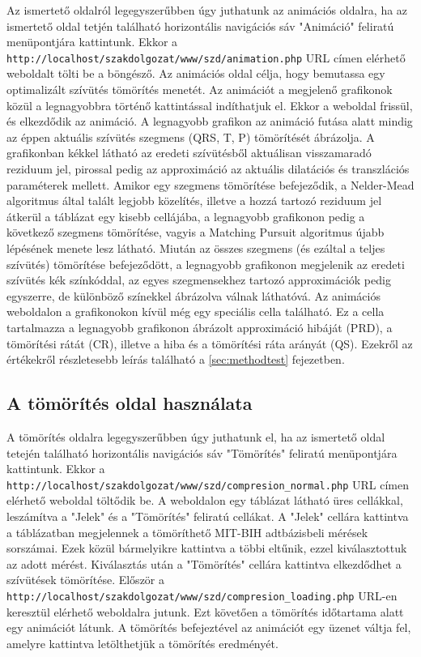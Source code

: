 \documentclass[oneside,titlepage,12pt,a4paper]{report}
\begin{document}
Az ismertető oldalról legegyszerűbben úgy juthatunk az animációs oldalra, ha az ismertető oldal tetjén található horizontális navigációs sáv "Animáció" feliratú menüpontjára kattintunk. Ekkor a \texttt{http://localhost/szakdolgozat/www/szd/animation.php} URL címen elérhető weboldalt tölti be a böngésző. Az animációs oldal célja, hogy bemutassa egy optimalizált szívütés tömörítés menetét. Az animációt a megjelenő grafikonok közül a legnagyobbra történő kattintással indíthatjuk el. Ekkor a weboldal frissül, és elkezdődik az animáció. A legnagyobb grafikon az animáció futása alatt mindig az éppen aktuális szívütés szegmens (QRS, T, P) tömörítését ábrázolja. A grafikonban kékkel látható az eredeti szívütésből aktuálisan visszamaradó reziduum jel, pirossal pedig az approximáció az aktuális dilatációs és transzlációs paraméterek mellett. Amikor egy szegmens tömörítése befejeződik, a Nelder-Mead algoritmus által talált legjobb közelítés, illetve a hozzá tartozó reziduum jel átkerül a táblázat egy kisebb cellájába, a legnagyobb grafikonon pedig a következő szegmens tömörítése, vagyis a Matching Pursuit algoritmus újabb lépésének menete lesz látható. Miután az összes szegmens (és ezáltal a teljes szívütés) tömörítése befejeződött, a legnagyobb grafikonon megjelenik az eredeti szívütés kék színkóddal, az egyes szegmensekhez tartozó approximációk pedig egyszerre, de különböző színekkel ábrázolva válnak láthatóvá. Az animációs weboldalon a grafikonokon kívül még egy speciális cella található. Ez a cella tartalmazza a legnagyobb grafikonon ábrázolt approximáció hibáját (PRD), a tömörítési rátát (CR), illetve a hiba és a tömörítési ráta arányát (QS). Ezekről az értékekről részletesebb leírás található a \ref{sec:methodtest} fejezetben.

\subsection*{A tömörítés oldal használata}

A tömörítés oldalra legegyszerűbben úgy juthatunk el, ha az ismertető oldal tetején található horizontális navigációs sáv "Tömörítés" feliratú menüpontjára kattintunk. Ekkor a \texttt{http://localhost/szakdolgozat/www/szd/compresion\_normal.php} URL címen elérhető weboldal töltődik be. A weboldalon egy táblázat látható üres cellákkal, leszámítva a "Jelek" és a "Tömörítés" feliratú cellákat. A "Jelek" cellára kattintva a táblázatban megjelennek a tömöríthető MIT-BIH adtbázisbeli mérések sorszámai. Ezek közül bármelyikre kattintva a többi eltűnik, ezzel kiválasztottuk az adott mérést. Kiválasztás után a "Tömörítés" cellára kattintva elkezdődhet a szívütések tömörítése. Először a \texttt{http://localhost/szakdolgozat/www/szd/compresion\_loading.php} \linebreak URL-en keresztül elérhető weboldalra jutunk. Ezt követően a tömörítés időtartama alatt egy animációt látunk. A tömörítés befejeztével az animációt egy üzenet váltja fel, amelyre kattintva letölthetjük a tömörítés eredményét.
\end{document}
